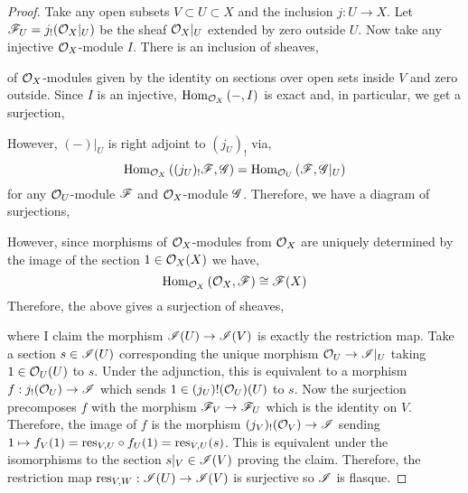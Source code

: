 \documentclass[12pt]{article}
\begin{document}
\begin{proof}
Take any open subsets $V \subset U \subset X$ and the inclusion $j : U \to X$. Let $\mathscr{F}_U = j_!(\mathcal{O}_{X}|_U)$ be the sheaf $\mathcal{O}_{X}|_U$ extended by zero outside $U$. Now take any injective $\mathcal{O}_{X}$-module $I$. There is an inclusion of sheaves,
\begin{center}
\end{center} 
of $\mathcal{O}_{X}$-modules given by the identity on sections over open sets inside $V$ and zero outside. Since $I$ is an injective, $\mathrm{Hom}_{\mathcal{O}_{X}} \left( -, I \right)$ is exact and, in particular, we get a surjection,
\begin{center}
\end{center}
However, $(-)|_U$ is right adjoint to $(j_U)_!$ via,
\[ \mathrm{Hom}_{\mathcal{O}_{X}} \left( (j_U)_! \mathscr{F}, \mathscr{G} \right) = \mathrm{Hom}_{\mathcal{O}_{U}} \left( \mathscr{F}, \mathscr{G}|_U \right) \]
for any $\mathcal{O}_{U}$-module $\mathscr{F}$ and $\mathcal{O}_{X}$-module $\mathscr{G}$. Therefore, we have a diagram of surjections,
\begin{center}
\end{center}
However, since morphisms of $\mathcal{O}_{X}$-modules from $\mathcal{O}_{X}$ are uniquely determined by the image of the section $1 \in \mathcal{O}_{X}(X)$ we have,
\[ \mathrm{Hom}_{\mathcal{O}_{X}} \left( \mathcal{O}_{X}, \mathscr{F} \right) \cong \mathscr{F}(X) \]
Therefore, the above gives a surjection of sheaves,
\begin{center}
\end{center}
where I claim the morphism $\mathscr{I}(U) \to \mathscr{I}(V)$ is exactly the restriction map. Take a section $s \in \mathscr{I}(U)$ corresponding the unique morphism $\mathcal{O}_{U} \to \mathscr{I}|_U$ taking $1 \in \mathcal{O}_{U}(U)$ to $s$. Under the adjunction, this is equivalent to a morphism $f : j_!(\mathcal{O}_{U}) \to \mathscr{I}$ which sends $1 \in (j_U)!(\mathcal{O}_{U})(U)$ to $s$. Now the surjection precomposes $f$ with the morphism $\mathscr{F}_V \to \mathscr{F}_U$ which is the identity on $V$. Therefore, the image of $f$ is the morphism $(j_V)_!(\mathcal{O}_{V}) \to \mathscr{I}$ sending $1 \mapsto f_V(1) = \mathrm{res}_{V,U} \circ f_U(1) = \mathrm{res}_{V,U}(s)$. This is equivalent under the isomorphisms to the section $s|_V \in \mathscr{I}(V)$ proving the claim. Therefore, the restriction map $\mathrm{res}_{V, W} : \mathscr{I}(U) \to \mathscr{I}(V)$ is surjective so $\mathscr{I}$ is flasque. 
\end{proof}
\end{document}
